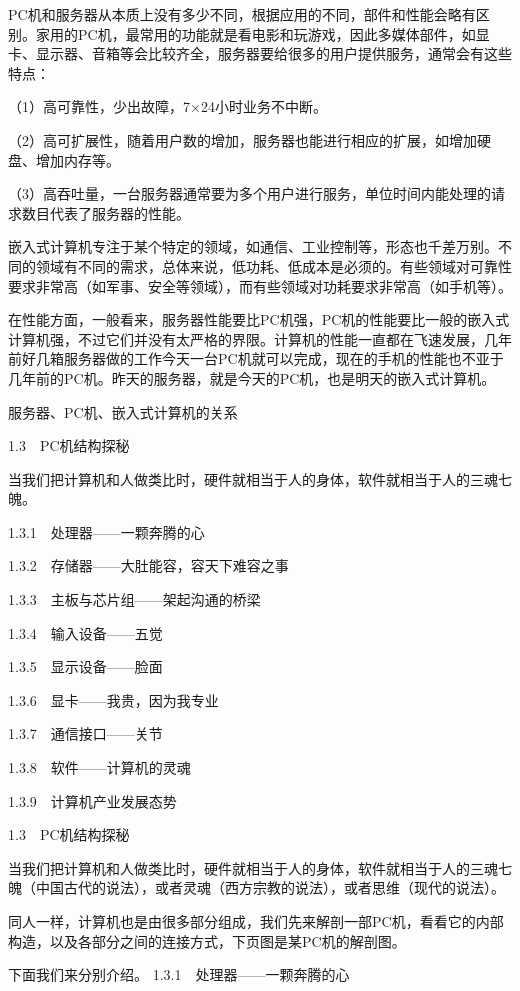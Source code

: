\documentclass[12pt,UTF8]{ctexbook}
\begin{document}
PC机和服务器从本质上没有多少不同，根据应用的不同，部件和性能会略有区别。家用的PC机，最常用的功能就是看电影和玩游戏，因此多媒体部件，如显卡、显示器、音箱等会比较齐全，服务器要给很多的用户提供服务，通常会有这些特点：

（1）高可靠性，少出故障，7×24小时业务不中断。

（2）高可扩展性，随着用户数的增加，服务器也能进行相应的扩展，如增加硬盘、增加内存等。

（3）高吞吐量，一台服务器通常要为多个用户进行服务，单位时间内能处理的请求数目代表了服务器的性能。

嵌入式计算机专注于某个特定的领域，如通信、工业控制等，形态也千差万别。不同的领域有不同的需求，总体来说，低功耗、低成本是必须的。有些领域对可靠性要求非常高（如军事、安全等领域），而有些领域对功耗要求非常高（如手机等）。

在性能方面，一般看来，服务器性能要比PC机强，PC机的性能要比一般的嵌入式计算机强，不过它们并没有太严格的界限。计算机的性能一直都在飞速发展，几年前好几箱服务器做的工作今天一台PC机就可以完成，现在的手机的性能也不亚于几年前的PC机。昨天的服务器，就是今天的PC机，也是明天的嵌入式计算机。

服务器、PC机、嵌入式计算机的关系



1.3　PC机结构探秘

当我们把计算机和人做类比时，硬件就相当于人的身体，软件就相当于人的三魂七魄。

1.3.1　处理器——一颗奔腾的心

1.3.2　存储器——大肚能容，容天下难容之事

1.3.3　主板与芯片组——架起沟通的桥梁

1.3.4　输入设备——五觉

1.3.5　显示设备——脸面

1.3.6　显卡——我贵，因为我专业

1.3.7　通信接口——关节

1.3.8　软件——计算机的灵魂

1.3.9　计算机产业发展态势


1.3　PC机结构探秘

当我们把计算机和人做类比时，硬件就相当于人的身体，软件就相当于人的三魂七魄（中国古代的说法），或者灵魂（西方宗教的说法），或者思维（现代的说法）。

同人一样，计算机也是由很多部分组成，我们先来解剖一部PC机，看看它的内部构造，以及各部分之间的连接方式，下页图是某PC机的解剖图。

下面我们来分别介绍。
1.3.1　处理器——一颗奔腾的心
\end{document}
